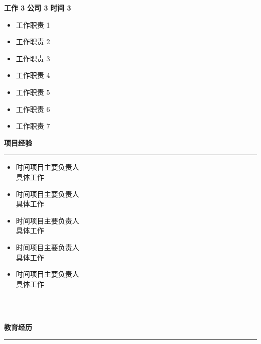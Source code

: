 \documentclass{article}
\theoremstyle{plain}
\begin{document}
\MakeUppercase{\normalsize\textbf{工作 3}}
\hfill
\MakeUppercase{\normalsize\textbf{公司 3}}
\hfill
\MakeUppercase{\normalsize\textbf{时间 3}}
\begin{itemize}
	\item{\normalsize{工作职责 1}}
	\item{\normalsize{工作职责 2}}
	\item{\normalsize{工作职责 3}}
	\item{\normalsize{工作职责 4}}
	\item{\normalsize{工作职责 5}}
	\item{\normalsize{工作职责 6}}
	\item{\normalsize{工作职责 7}}
\end{itemize}
\newpage



\begin{flushleft}
\MakeUppercase{\LARGE\textbf{项目经验}} 
\end{flushleft}
\rule[4pt]{18cm}{0.5pt}
\begin{itemize}
	\item{\normalsize{时间}\hfill\normalsize{项目}\hfill\normalsize{主要负责人}\\\normalsize{具体工作}}
	\item{\normalsize{时间}\hfill\normalsize{项目}\hfill\normalsize{主要负责人}\\\normalsize{具体工作}}
	\item{\normalsize{时间}\hfill\normalsize{项目}\hfill\normalsize{主要负责人}\\\normalsize{具体工作}}
	\item{\normalsize{时间}\hfill\normalsize{项目}\hfill\normalsize{主要负责人}\\\normalsize{具体工作}}
	\item{\normalsize{时间}\hfill\normalsize{项目}\hfill\normalsize{主要负责人}\\\normalsize{具体工作}}
\end{itemize}


\\\hspace*{\fill}\\


\begin{flushleft}
\MakeUppercase{\LARGE\textbf{教育经历}} %
\end{flushleft}
\rule[4pt]{18cm}{0.5pt} %
\end{document}
